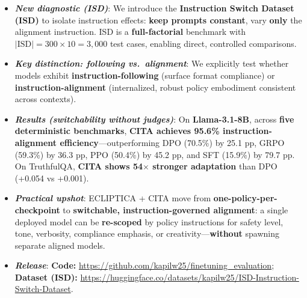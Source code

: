 \documentclass[11pt]{article}
\begin{document}
\begin{defin}
\begin{itemize}[left=-4pt,itemsep=0pt,topsep=0pt,parsep=0pt]
\item[\faVial] \textbf{\textit{New diagnostic (ISD)}}:
We introduce the \textbf{Instruction Switch Dataset (ISD)} to isolate instruction effects:
\textbf{keep prompts constant}, vary \textbf{only} the alignment instruction.
ISD is a \textbf{full-factorial} benchmark with
\(\lvert\text{ISD}\rvert = 300 \times 10 = 3{,}000\) test cases, enabling direct, controlled comparisons.

\item[\faBalanceScale] \textbf{\textit{Key distinction: following vs.\ alignment}}:
We explicitly test whether models exhibit \textbf{instruction-following} (surface format compliance)
or \textbf{instruction-alignment} (internalized, robust policy embodiment consistent across contexts).

\item[\faChartLine] \textbf{\textit{Results (switchability without judges)}}:
On \textbf{Llama-3.1-8B}, across \textbf{five deterministic benchmarks},
\textbf{CITA achieves \colorbox{bg-green}{95.6\%} instruction-alignment efficiency}---outperforming DPO (70.5\%) by 25.1 pp, GRPO (59.3\%) by 36.3 pp, PPO (50.4\%) by 45.2 pp, and SFT (15.9\%) by 79.7 pp.
On TruthfulQA, \textbf{CITA shows 54$\times$ stronger adaptation} than DPO (+0.054 vs +0.001).

\item[\faTools] \textbf{\textit{Practical upshot}}:
ECLIPTICA + CITA move from \textbf{one-policy-per-checkpoint} to \textbf{switchable, instruction-governed alignment}:
a single deployed model can be \textbf{re-scoped} by policy instructions for safety level, tone, verbosity, compliance emphasis, or creativity---\textbf{without} spawning separate aligned models.

\item[\faCode] \textbf{\textit{Release}}:
\textbf{Code:} \url{https://github.com/kapilw25/finetuning_evaluation};
\textbf{Dataset (ISD):} \url{https://huggingface.co/datasets/kapilw25/ISD-Instruction-Switch-Dataset}.


\end{itemize}
\vspace{-2mm}
\end{defin}





\end{document}
